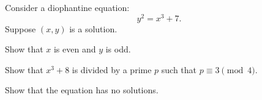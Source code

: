 \documentclass{../prb}
\begin{document}
\begin{prb}
Consider a diophantine equation:
\[y^2=x^3+7.\]
Suppose $(x,y)$ is a solution.
\begin{cond}
\item Show that $x$ is even and $y$ is odd.
\item Show that $x^3+8$ is divided by a prime $p$ such that $p\equiv3\pmod{4}$.
\item Show that the equation has no solutions.
\end{cond}
\end{prb}
\end{document}
